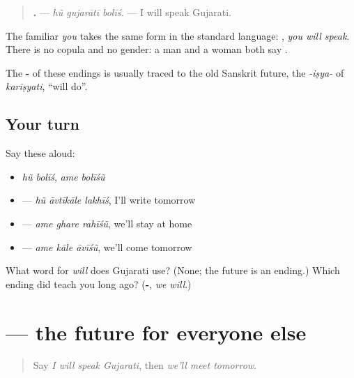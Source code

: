 \begin{quote}
\textbf{  .} — \emph{hũ gujarātī bolīś.} — I will speak Gujarati.
\end{quote}

The familiar \emph{you} takes the same form in the standard language: \textbf{ }, \emph{you will speak}. There is no copula and no gender: a man and a woman both say \textbf{ }.

The \textbf{-} of these endings is usually traced to the old Sanskrit future, the \emph{-iṣya-} of \emph{kariṣyati}, \textquotedblleft{}will do\textquotedblright{}.

\subsection*{Your turn}
Say these aloud:

\begin{itemize}
\raggedright
  \item \emph{hũ bolīś}, \emph{ame bolīśũ}
  \item \textbf{  } — \emph{hũ āvtīkāle lakhīś}, I'll write tomorrow
  \item \textbf{  } — \emph{ame ghare rahīśũ}, we'll stay at home
  \item \textbf{  } — \emph{ame kāle āvīśũ}, we'll come tomorrow
\end{itemize}

\begin{tcolorbox}[breakable,colback=teal!4,colframe=teal!35!black,title={Before you move on}]
What word for \emph{will} does Gujarati use? (None; the future is an ending.) Which ending did \textbf{} teach you long ago? (\textbf{-}, \emph{we will}.)
\end{tcolorbox}
\section[\texorpdfstring{…\gu{શે} · …\gu{શો} (-śe · -śo)}{…શે · …શો (-śe · -śo)}]{  — the future for everyone else}

\label{lesson:GU-C149-bolshe}



\begin{quote}
Say \emph{I will speak Gujarati}, then \emph{we'll meet tomorrow}.
\end{quote}

